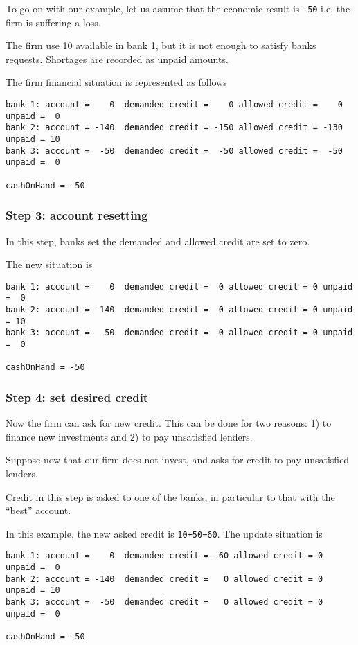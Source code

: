 \documentclass[a4paper]{article}
\begin{document}
To go on with our example, let us assume that the economic result is \verb+-50+ i.e. the firm is suffering a loss.

The firm use 10 available in bank 1, but it is not enough to satisfy banks requests. Shortages are recorded as unpaid amounts.

The firm financial situation is represented as follows

\begin{verbatim}
bank 1: account =    0  demanded credit =    0 allowed credit =    0 unpaid =  0
bank 2: account = -140  demanded credit = -150 allowed credit = -130 unpaid = 10
bank 3: account =  -50  demanded credit =  -50 allowed credit =  -50 unpaid =  0

cashOnHand = -50
\end{verbatim}

\subsubsection*{Step 3: account resetting}
In this step, banks set the demanded and allowed credit are set to zero.

The new situation is

\begin{verbatim}
bank 1: account =    0  demanded credit =  0 allowed credit = 0 unpaid =  0
bank 2: account = -140  demanded credit =  0 allowed credit = 0 unpaid = 10
bank 3: account =  -50  demanded credit =  0 allowed credit = 0 unpaid =  0

cashOnHand = -50
\end{verbatim}



\subsubsection*{Step 4: set desired credit}

Now the firm can ask for new credit. This can be done for two reasons: 1) to finance new investments and 2) to pay unsatisfied lenders.

Suppose now that our firm does not invest, and asks for credit to pay unsatisfied lenders.

Credit in this step is asked to one of the banks, in particular to that with the ``best'' account.

In this example, the new asked credit is \verb/10+50=60/. The update situation is 

\begin{verbatim}
bank 1: account =    0  demanded credit = -60 allowed credit = 0 unpaid =  0
bank 2: account = -140  demanded credit =   0 allowed credit = 0 unpaid = 10
bank 3: account =  -50  demanded credit =   0 allowed credit = 0 unpaid =  0

cashOnHand = -50
\end{verbatim}
\end{document}
